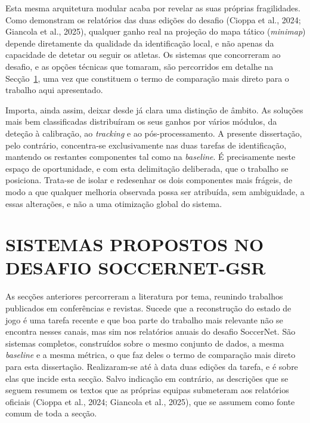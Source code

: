 
Esta mesma arquitetura modular acaba por revelar as suas próprias fragilidades. Como
demonstram os relatórios das duas edições do desafio (Cioppa et al., 2024; Giancola
et al., 2025), qualquer ganho real na projeção do mapa tático (\emph{minimap}) depende
diretamente da qualidade da identificação local, e não apenas da capacidade de detetar
ou seguir os atletas. Os sistemas que concorreram ao desafio, e as opções técnicas que
tomaram, são percorridos em detalhe na Secção~\ref{sec:sistemas_gsr}, uma vez que
constituem o termo de comparação mais direto para o trabalho aqui apresentado.

Importa, ainda assim, deixar desde já clara uma distinção de âmbito. As soluções mais
bem classificadas distribuíram os seus ganhos por vários módulos, da deteção à
calibração, ao \emph{tracking} e ao pós-processamento. A presente dissertação, pelo
contrário, concentra-se exclusivamente nas duas tarefas de identificação, mantendo os
restantes componentes tal como na \emph{baseline}. É precisamente neste espaço de
oportunidade, e com esta delimitação deliberada, que o trabalho se posiciona. Trata-se
de isolar e redesenhar os dois componentes mais frágeis, de modo a que qualquer melhoria
observada possa ser atribuída, sem ambiguidade, a essas alterações, e não a uma
otimização global do sistema.



\section{SISTEMAS PROPOSTOS NO DESAFIO SOCCERNET-GSR}
\label{sec:sistemas_gsr}

As secções anteriores percorreram a literatura por tema, reunindo trabalhos publicados em
conferências e revistas. Sucede que a reconstrução do estado de jogo é uma tarefa recente
e que boa parte do trabalho mais relevante não se encontra nesses canais, mas sim nos
relatórios anuais do desafio SoccerNet. São sistemas completos, construídos sobre o mesmo
conjunto de dados, a mesma \emph{baseline} e a mesma métrica, o que faz deles o termo de
comparação mais direto para esta dissertação. Realizaram-se até à data duas edições da
tarefa, e é sobre elas que incide esta secção. Salvo indicação em contrário, as descrições
que se seguem resumem os textos que as próprias equipas submeteram aos relatórios oficiais
(Cioppa et al., 2024; Giancola et al., 2025), que se assumem como fonte comum de toda a
secção.

